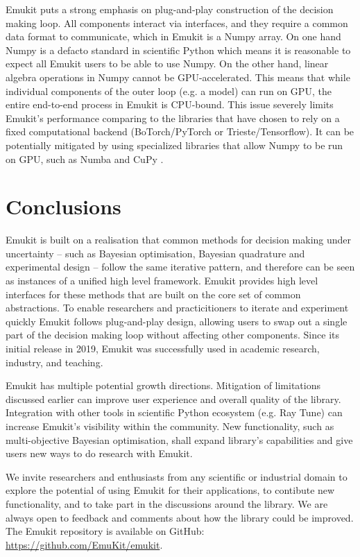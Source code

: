 Emukit puts a strong emphasis on plug-and-play construction of the decision making loop. All components interact via interfaces, and they require a common data format to communicate, which in Emukit is a Numpy array. On one hand Numpy is a defacto standard in scientific Python which means it is reasonable to expect all Emukit users to be able to use Numpy. On the other hand, linear algebra operations in Numpy cannot be GPU-accelerated. This means that while individual components of the outer loop  (e.g. a model) can run on GPU, the entire end-to-end process in Emukit is CPU-bound. This issue severely limits Emukit's performance comparing to the libraries that have chosen to rely on a fixed computational backend (BoTorch/PyTorch or Trieste/Tensorflow). It can be potentially mitigated by using specialized libraries that allow Numpy to be run on GPU, such as Numba \cite{lam2015numba} and CuPy \cite{nishino2017cupy}.

\section{Conclusions}
Emukit is built on a realisation that common methods for decision making under uncertainty -- such as Bayesian optimisation, Bayesian quadrature and experimental design -- follow the same iterative pattern, and therefore can be seen as instances of a unified high level framework. Emukit provides high level interfaces for these methods that are built on the core set of common abstractions. To enable researchers and practicitioners to iterate and experiment quickly Emukit follows plug-and-play design, allowing users to swap out a single part of the decision making loop without affecting other components. Since its initial release in 2019, Emukit was successfully used in academic research, industry, and teaching.

Emukit has multiple potential growth directions. Mitigation of limitations discussed earlier can improve user experience and overall quality of the library. Integration with other tools in scientific Python ecosystem (e.g. Ray Tune) can increase Emukit's visibility within the community. New functionality, such as multi-objective Bayesian optimisation, shall expand library's capabilities and give users new ways to do research with Emukit.

We invite researchers and enthusiasts from any scientific or industrial domain to explore the potential of using Emukit for their applications, to contibute new functionality, and to take part in the discussions around the library. We are always open to feedback and comments about how the library could be improved. The Emukit repository is available on GitHub: \url{https://github.com/EmuKit/emukit}.

